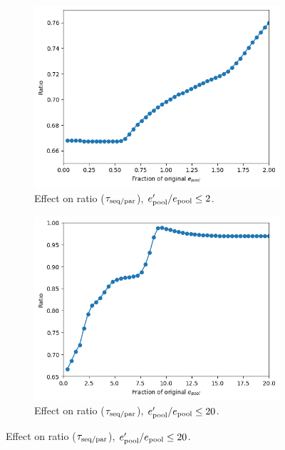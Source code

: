 \begin{figure}
  \centering
  \begin{subfigure}[htpb]{0.45\textwidth}
   \centering
   \includegraphics[width=\textwidth]{epool_ec_ratio_shrinkyaxis}
   \caption{
     Effect on ratio ($\tau_{\mathrm{seq}/\mathrm{par}}$), $e_{\mathrm{pool}}^{\prime}/e_{\mathrm{pool}} \leq 2$.
   }
   \label{fig:model-pool-ratio}
  \end{subfigure}%
  \begin{subfigure}[htpb]{0.45\textwidth}
   \centering
   \includegraphics[width=\textwidth]{epool_ec_ratio_20_shrinkyaxis}
   \caption{
     Effect on ratio ($\tau_{\mathrm{seq}/\mathrm{par}}$), $e_{\mathrm{pool}}^{\prime}/e_{\mathrm{pool}} \leq 20$.
   }
   \label{fig:model-pool-ratio-20}
  \end{subfigure}


\end{figure}
